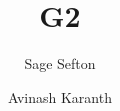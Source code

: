 \documentclass[sigconf,usenames,dvipsnames,svgnames,table]{acmart}
\begin{document}
\def \sysname {\textsc{G2}\xspace}
\def \oldname {\textsc{GARUDA}\xspace}
\def \defeq   {\triangleq}
\newcommand{\interp}[1]{\llbracket #1 \rrbracket}



\title{\sysname}


\author{Sage Sefton}

\author{Avinash Karanth}



\renewcommand{\shortauthors}{Sefton and Karanth et. al.}
\end{document}
